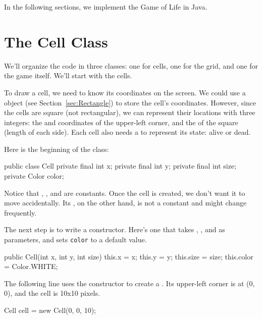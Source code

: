 In the following sections, we implement the Game of Life in Java.


\section{The Cell Class}


We'll organize the code in three classes: one for cells, one for the grid, and one for the game itself.
We'll start with the cells.

To draw a cell, we need to know its coordinates on the screen.
We could use a  object (see Section~\ref{sec:Rectangle}) to store the cell's coordinates.
However, since the cells are square (not rectangular), we can represent their locations with three integers: the  and  coordinates of the upper-left corner, and the  of the square (length of each side).
Each cell also needs a  to represent its state: alive or dead.

Here is the beginning of the  class:

\begin{code}
public class Cell {
    private final int x;
    private final int y;
    private final int size;
    private Color color;
}
\end{code}

Notice that , , and  are constants.
Once the cell is created, we don't want it to move accidentally.
Its , on the other hand, is not a constant and might change frequently.


The next step is to write a constructor.
Here's one that takes , , and  as parameters, and sets {\tt color} to a default value.

\begin{code}
public Cell(int x, int y, int size) {
    this.x = x;
    this.y = y;
    this.size = size;
    this.color = Color.WHITE;
}
\end{code}

The following line uses the constructor to create a .
Its upper-left corner is at (0, 0), and the cell is 10x10 pixels.

\begin{code}
Cell cell = new Cell(0, 0, 10);
\end{code}

